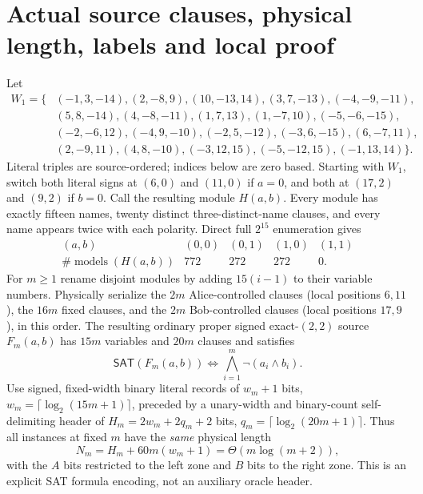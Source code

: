 \documentclass[11pt]{article}
\newcommand{\SAT}{\mathsf{SAT}}
\begin{document}
\section{Actual source clauses, physical length, labels and local proof}
Let
\[
\begin{split}
W_1=\{&(-1,3,-14),(2,-8,9),(10,-13,14),(3,7,-13),(-4,-9,-11),\\
&(5,8,-14),(4,-8,-11),(1,7,13),(1,-7,10),(-5,-6,-15),\\
&(-2,-6,12),(-4,9,-10),(-2,5,-12),(-3,6,-15),(6,-7,11),\\
&(2,-9,11),(4,8,-10),(-3,12,15),(-5,-12,15),(-1,13,14)\}.
\end{split}\tag{1}
\]
Literal triples are source-ordered; indices below are zero based. Starting with $W_1$, switch both literal signs at $(6,0)$ and $(11,0)$ if $a=0$, and both at $(17,2)$ and $(9,2)$ if $b=0$. Call the resulting module $H(a,b)$. Every module has exactly fifteen names, twenty distinct three-distinct-name clauses, and every name appears twice with each polarity. Direct full $2^{15}$ enumeration gives
\[
\begin{array}{c|rrrr}
(a,b)&(0,0)&(0,1)&(1,0)&(1,1)\\\hline
\#\operatorname{models}(H(a,b))&772&272&272&0.
\end{array}\tag{2}
\]
For $m\ge1$ rename disjoint modules by adding $15(i-1)$ to their variable numbers. Physically serialize the $2m$ Alice-controlled clauses (local positions $6,11$), the $16m$ fixed clauses, and the $2m$ Bob-controlled clauses (local positions $17,9$), in this order. The resulting ordinary proper signed exact-$(2,2)$ source $F_m(a,b)$ has $15m$ variables and $20m$ clauses and satisfies
\[
\boxed{\SAT(F_m(a,b))\iff\bigwedge_{i=1}^m\neg(a_i\wedge b_i).}\tag{3}
\]
Use signed, fixed-width binary literal records of $w_m+1$ bits, $w_m=\lceil\log_2(15m+1)\rceil$, preceded by a unary-width and binary-count self-delimiting header of $H_m=2w_m+2q_m+2$ bits, $q_m=\lceil\log_2(20m+1)\rceil$. Thus all instances at fixed $m$ have the \emph{same} physical length
\[
 N_m=H_m+60m(w_m+1)=\Theta(m\log(m+2)),\tag{4}
\]
with the $A$ bits restricted to the left zone and $B$ bits to the right zone. This is an explicit SAT formula encoding, not an auxiliary oracle header.
\end{document}
